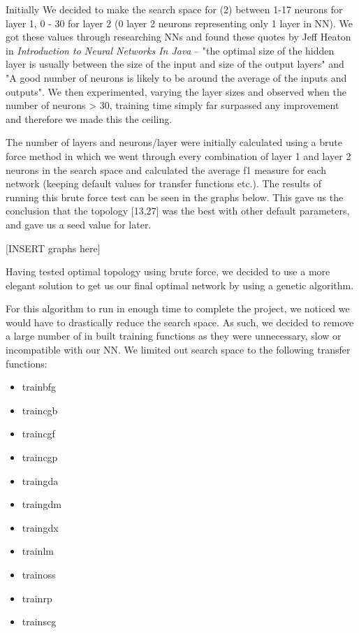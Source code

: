 \documentclass[11pt]{article}
\begin{document}
Initially We decided to make the search space for (2) between 1-17 neurons for layer 1, 0 - 30 for layer 2 (0 layer 2 neurons representing only 1 layer in NN). We got these values through researching NNs and found these quotes by Jeff Heaton in \emph{Introduction to Neural Networks In Java} -- "the optimal size of the hidden layer is usually between the size of the input and size of the output layers" and "A good number of neurons is likely to be around the average of the inputs and outputs". We then experimented, varying the layer sizes and observed when the number of neurons > 30, training time simply far surpassed any improvement and therefore we made this the ceiling.

The number of layers and neurons/layer were initially calculated using a brute force method in which we went through every combination of layer 1 and layer 2 neurons in the search space and calculated the average f1 measure for each network (keeping default values for transfer functions etc.). The results of running this brute force test can be seen in the graphs below. This gave us the conclusion that the topology [13,27] was the best with other default parameters, and gave us a seed value for later.

[INSERT graphs here]

Having tested optimal topology using brute force, we decided to use a more elegant solution to get us our final optimal network by using a genetic algorithm.

For this algorithm to run in enough time to complete the project, we noticed we would have to drastically reduce the search space. As such, we decided to remove a large number of in built training functions as they were unnecessary, slow or incompatible with our NN.
We limited out search space to the following transfer functions:
\begin{multicols}{2}
\begin{itemize}
  \item trainbfg
  \item traincgb
  \item traincgf
  \item traincgp
  \item traingda
  \item traingdm
  \item traingdx
  \item trainlm
  \item trainoss
  \item trainrp
  \item trainscg 
\end{itemize}
\end{multicols}
\end{document}
